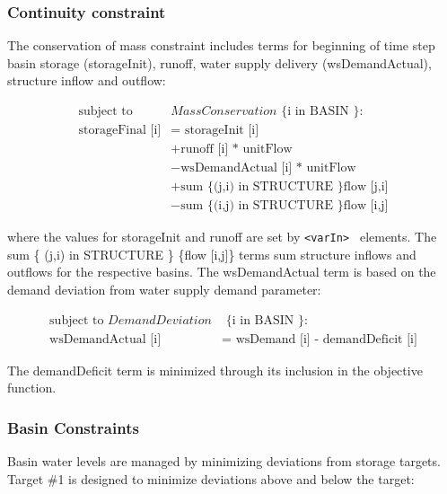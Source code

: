 \subsubsection{Continuity constraint}

The conservation of mass constraint includes terms for beginning of
time step basin storage (storageInit), runoff, water supply delivery
(wsDemandActual), structure inflow and outflow:

\begin{equation}
 \begin{split}
   \textrm {subject to } & MassConservation \textrm { \{ i in BASIN \}} : \\
   \textrm {storageFinal [i]} & = \textrm { storageInit [i]} \\
                   & + \textrm {runoff [i] * unitFlow} \\
                   & - \textrm {wsDemandActual [i] * unitFlow} \\
                   & + \textrm {sum \{ (j,i) in STRUCTURE \} }  \textrm {flow [j,i]} \\ 
                   & - \textrm {sum \{ (i,j) in STRUCTURE \} }  \textrm {flow [i,j]} 
 \end{split}
\end{equation}

where the values for storageInit and runoff are set by {\tt <varIn> }
elements.  The \textrm {sum \{ (j,i) in STRUCTURE \} \{flow [i,j]\}} terms
sum structure inflows and outflows for the respective basins.  The
wsDemandActual term is based on the demand deviation from water supply
demand parameter:

\begin{equation}
 \begin{split}
  \textrm { subject to } DemandDeviation  & \textrm { \{ i in BASIN \} } : \\
  \textrm { wsDemandActual [i] } & =  \textrm { wsDemand [i] - demandDeficit [i] } 
 \end{split}
\end{equation}

The demandDeficit term is minimized through its inclusion in the
objective function.  

\subsubsection {Basin Constraints }

Basin water levels are managed by minimizing deviations from storage
targets.  Target \#1 is designed to minimize deviations above and
below the target:


